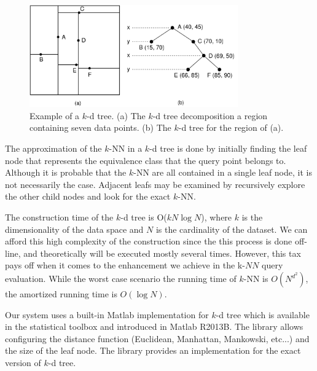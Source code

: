 \begin{figure}
\centering
\includegraphics[width=0.8\textwidth]{./figures/kd_tree}       
\caption{Example of a $k$-d tree. (a) The $k$-d tree decomposition  a region containing seven data points. (b) The $k$-d tree for the region of (a).}
\label{fig:kd_tree}
\end{figure}

\iftoggle{edit-mode}{\hspace{0pt}\marginpar{How the NN are found?}}{}
The approximation of the $k$-NN in a $k$-d tree is done by initially finding the leaf node that represents the equivalence class that the query point belongs to. 
Although it is probable that the $k$-NN are all contained in a single leaf node, it is not necessarily the case. 
Adjacent leafs may be examined by recursively explore the other child nodes and look for the exact $k$-NN. 
 
\iftoggle{edit-mode}{\hspace{0pt}\marginpar{Expected time complexity}}{}
The construction time of the $k$-d tree is O($k N \log N$), where $k$ is the dimensionality of the data space and $N$ is the cardinality of the dataset. 
We can afford this high complexity of the construction since the this process is done off-line, and theoretically will be executed mostly several times. 
However, this tax pays off when it comes to the enhancement we achieve in the k-$NN$ query evaluation. 
While the worst case scenario the running time of $k$-NN is $O(N^{d^2})$, the amortized running time is $O(\log N)$.

\iftoggle{edit-mode}{\hspace{0pt}\marginpar{The Matlab library}}{} 
Our system uses a built-in Matlab implementation for $k$-d tree which is available in the statistical toolbox and introduced in Matlab R2013B. 
The library allows configuring the distance function (Euclidean, Manhattan, Mankowski, etc...) and the size of the leaf node. 
The library provides an implementation for the exact version of $k$-d tree.

